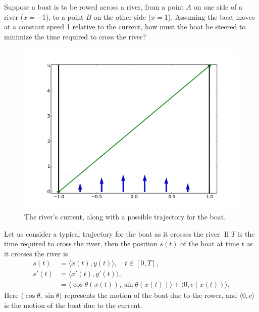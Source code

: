 \label{lab:rivercrossing}

Suppose a boat is to be rowed across a river, from a point $A$ on one side of a river ($x=-1$), to a point $B$ on the other side ($x=1$). 
Assuming the boat moves at a constant speed 1 relative to the current, how must the boat be steered to minimize the time required to cross the river? 

\begin{figure}
\centering
\includegraphics[width=\textwidth]{rivercurrent.pdf}
\caption{The river's current, along with a possible trajectory for the boat.}
\label{fig:rivercrossing_current}
\end{figure}

Let us consider a typical trajectory for the boat as it crosses the river. 
If $T$ is the time required to cross the river, then the position $s(t)$ of the boat at time $t$ as it crosses the river is
\begin{align*}
	s(t) &= \langle x(t), y(t) \rangle, \quad t \in [0,T], \\
	s'(t) &= \langle x'(t), y'(t) \rangle, \\
	&= \langle \cos \theta(x(t)),\sin \theta(x(t)) \rangle + \langle 0, c(x(t)) \rangle.
\end{align*}
Here $\langle \cos \theta, \sin \theta \rangle$ represents the motion of the boat due to the rower, and $\langle 0, c \rangle$ is the motion of the boat due to the current.

